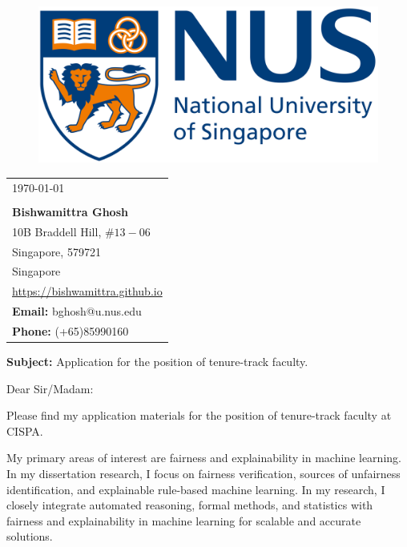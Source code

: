 \documentclass[a4paper,10pt]{article}
\newcommand{\blue}[1]{\textcolor{blue}{#1}}
\begin{document}
	
	
	
	\begin{figure}[t]
		\includegraphics[scale=0.03]{logo}
	\end{figure}
	\noindent\makebox[\linewidth]{\rule{\textwidth}{1pt}}
	
	
	\begin{flushright}
		\begin{tabular}{l@{}}
			\today \\
			\newline \\
			\textbf{Bishwamittra Ghosh}\\
			10B Braddell Hill, $ \#13-06 $\\ 
			Singapore, 579721\\
			Singapore\\
			\blue{\url{https://bishwamittra.github.io}}\\
			\textbf{Email:} bghosh@u.nus.edu\\
			\textbf{Phone:} (+65)85990160\\
		\end{tabular}%
	\end{flushright}


	\textbf{Subject:} Application for the position of tenure-track faculty. 
	
	
	
	\vspace{1em}
	Dear Sir/Madam:
	
	
	
	\vspace{1em}
	Please find my application materials for the position of tenure-track faculty at CISPA.
	
	\vspace{1em}
	My primary areas of interest are  fairness and explainability in machine learning. In my dissertation research, I focus on  fairness verification, sources of unfairness identification, and  explainable rule-based machine learning. In my research, I closely integrate automated reasoning, formal methods, and statistics with fairness and explainability in machine learning for scalable and accurate solutions.
	
\end{document}
